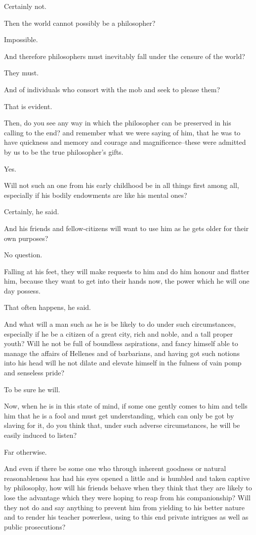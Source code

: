 Certainly not.

Then the world cannot possibly be a philosopher?

Impossible.

And therefore philosophers must inevitably fall under the censure of the
world?

They must.

And of individuals who consort with the mob and seek to please them?

That is evident.

Then, do you see any way in which the philosopher can be preserved in
his calling to the end? and remember what we were saying of him, that
he was to have quickness and memory and courage and magnificence--these
were admitted by us to be the true philosopher's gifts.

Yes.

Will not such an one from his early childhood be in all things first
among all, especially if his bodily endowments are like his mental ones?

Certainly, he said.

And his friends and fellow-citizens will want to use him as he gets
older for their own purposes?

No question.

Falling at his feet, they will make requests to him and do him honour
and flatter him, because they want to get into their hands now, the
power which he will one day possess.

That often happens, he said.

And what will a man such as he is be likely to do under such
circumstances, especially if he be a citizen of a great city, rich
and noble, and a tall proper youth? Will he not be full of boundless
aspirations, and fancy himself able to manage the affairs of Hellenes
and of barbarians, and having got such notions into his head will he
not dilate and elevate himself in the fulness of vain pomp and senseless
pride?

To be sure he will.

Now, when he is in this state of mind, if some one gently comes to him
and tells him that he is a fool and must get understanding, which can
only be got by slaving for it, do you think that, under such adverse
circumstances, he will be easily induced to listen?

Far otherwise.

And even if there be some one who through inherent goodness or natural
reasonableness has had his eyes opened a little and is humbled and taken
captive by philosophy, how will his friends behave when they think that
they are likely to lose the advantage which they were hoping to reap
from his companionship? Will they not do and say anything to prevent him
from yielding to his better nature and to render his teacher powerless,
using to this end private intrigues as well as public prosecutions?

